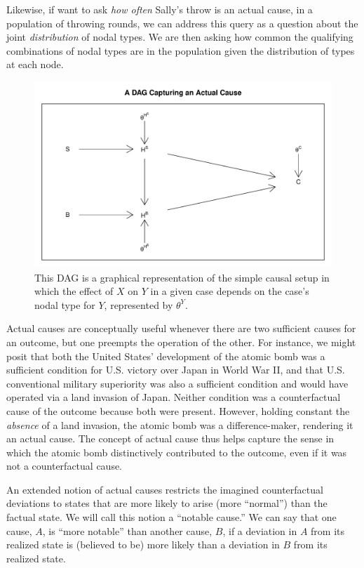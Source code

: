 \documentclass[
  12pt,
]{book}
\begin{document}
Likewise, if want to ask \emph{how often} Sally's throw is an actual cause, in a population of throwing rounds, we can address this query as a question about the joint \emph{distribution} of nodal types. We are then asking how common the qualifying combinations of nodal types are in the population given the distribution of types at each node.

\begin{figure}

{\centering \includegraphics[width=0.6\linewidth]{ii_files/figure-latex/actualquery-1} 

}

\caption{This DAG is a graphical representation of the simple causal setup in which the effect of $X$ on $Y$ in a given case depends on the case's nodal type for $Y$, represented by $\theta^Y$.}\label{fig:actualquery}
\end{figure}

Actual causes are conceptually useful whenever there are two sufficient causes for an outcome, but one preempts the operation of the other. For instance, we might posit that both the United States' development of the atomic bomb was a sufficient condition for U.S. victory over Japan in World War II, and that U.S. conventional military superiority was also a sufficient condition and would have operated via a land invasion of Japan. Neither condition was a counterfactual cause of the outcome because both were present. However, holding constant the \emph{absence} of a land invasion, the atomic bomb was a difference-maker, rendering it an actual cause. The concept of actual cause thus helps capture the sense in which the atomic bomb distinctively contributed to the outcome, even if it was not a counterfactual cause.

An extended notion \citep[p 81]{halpern2016actual} of actual causes restricts the imagined counterfactual deviations to states that are more likely to arise (more ``normal'') than the factual state. We will call this notion a ``notable cause.'' We can say that one cause, \(A\), is ``more notable'' than another cause, \(B\), if a deviation in \(A\) from its realized state is (believed to be) more likely than a deviation in \(B\) from its realized state.
\end{document}
